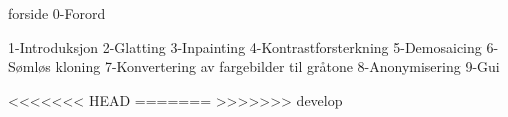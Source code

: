\documentclass{article}
\begin{document}
{forside}
\frontmatter
{0-Forord}
\newpage
\tableofcontents

\newpage
\mainmatter
{1-Introduksjon}
{2-Glatting}
{3-Inpainting}
{4-Kontrastforsterkning}
{5-Demosaicing}
{6-Sømløs kloning}
{7-Konvertering av fargebilder til gråtone}
{8-Anonymisering}
{9-Gui}

\newpage
\listoffigures
\newpage

<<<<<<< HEAD
=======
\nocite{PCP}
>>>>>>> develop
\end{document}
